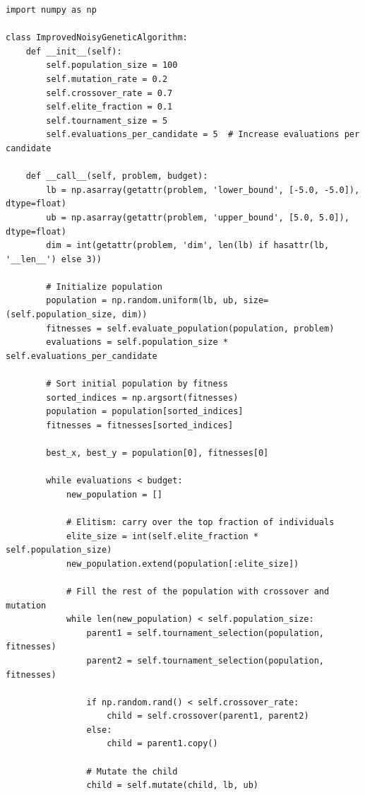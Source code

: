 \begin{lstlisting}[style=championprogram,caption={Complete generated \texttt{ImprovedNoisyGeneticAlgorithm} champion with five-observation averaging.},label={lst:generated_ga_complete}]
import numpy as np

class ImprovedNoisyGeneticAlgorithm:
    def __init__(self):
        self.population_size = 100
        self.mutation_rate = 0.2
        self.crossover_rate = 0.7
        self.elite_fraction = 0.1
        self.tournament_size = 5
        self.evaluations_per_candidate = 5  # Increase evaluations per candidate

    def __call__(self, problem, budget):
        lb = np.asarray(getattr(problem, 'lower_bound', [-5.0, -5.0]), dtype=float)
        ub = np.asarray(getattr(problem, 'upper_bound', [5.0, 5.0]), dtype=float)
        dim = int(getattr(problem, 'dim', len(lb) if hasattr(lb, '__len__') else 3))

        # Initialize population
        population = np.random.uniform(lb, ub, size=(self.population_size, dim))
        fitnesses = self.evaluate_population(population, problem)
        evaluations = self.population_size * self.evaluations_per_candidate

        # Sort initial population by fitness
        sorted_indices = np.argsort(fitnesses)
        population = population[sorted_indices]
        fitnesses = fitnesses[sorted_indices]

        best_x, best_y = population[0], fitnesses[0]

        while evaluations < budget:
            new_population = []

            # Elitism: carry over the top fraction of individuals
            elite_size = int(self.elite_fraction * self.population_size)
            new_population.extend(population[:elite_size])

            # Fill the rest of the population with crossover and mutation
            while len(new_population) < self.population_size:
                parent1 = self.tournament_selection(population, fitnesses)
                parent2 = self.tournament_selection(population, fitnesses)

                if np.random.rand() < self.crossover_rate:
                    child = self.crossover(parent1, parent2)
                else:
                    child = parent1.copy()

                # Mutate the child
                child = self.mutate(child, lb, ub)


\end{lstlisting}
